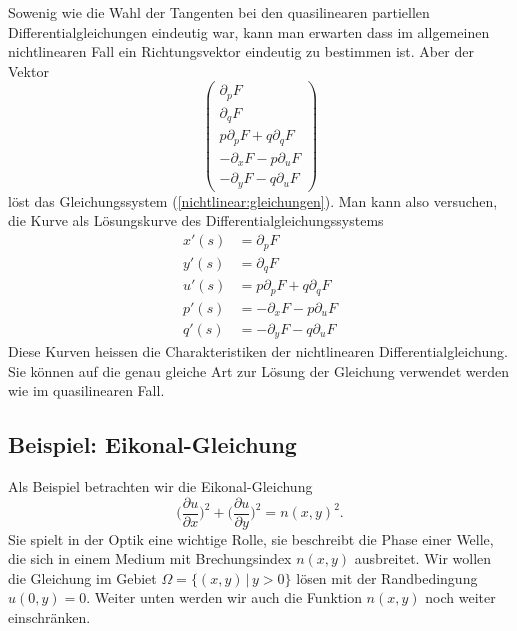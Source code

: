 Sowenig wie die Wahl der Tangenten bei den quasilinearen partiellen
Differentialgleichungen eindeutig war, kann man erwarten dass im
allgemeinen nichtlinearen Fall ein Richtungsvektor eindeutig zu
bestimmen ist. Aber der Vektor 
\[
\begin{pmatrix}
\partial_pF\\
\partial_qF\\
p\partial_pF+q\partial_qF\\
-\partial_xF-p\partial_uF\\
-\partial_yF-q\partial_uF
\end{pmatrix}
\]
löst das Gleichungssystem (\ref{nichtlinear:gleichungen}).
Man kann also versuchen, die Kurve als Lösungskurve des
Differentialgleichungssystems
\begin{align*}
x'(s)
&=
\partial_pF
\\
y'(s)
&=
\partial_qF
\\
u'(s)
&=
p\partial_pF+q\partial_qF
\\
p'(s)
&=
-\partial_xF-p\partial_uF
\\
q'(s)
&=
-\partial_yF-q\partial_uF
\end{align*}
Diese Kurven heissen die Charakteristiken der nichtlinearen
Differentialgleichung.
Sie können auf die genau gleiche Art zur Lösung der Gleichung
verwendet werden wie im quasilinearen Fall.

\subsection{Beispiel: Eikonal-Gleichung}
Als Beispiel betrachten wir die Eikonal-Gleichung 
\[
\biggl(\frac{\partial u}{\partial x}\biggr)^2
+
\biggl(\frac{\partial u}{\partial y}\biggr)^2
=
n(x,y)^2.
\]
Sie spielt in der Optik eine wichtige Rolle, sie beschreibt die
Phase einer Welle, die sich in einem Medium mit Brechungsindex $n(x,y)$
ausbreitet. Wir wollen die Gleichung im Gebiet $\Omega=\{(x,y)\,|\,y>0\}$
lösen mit der Randbedingung $u(0,y)=0$. Weiter unten werden wir auch 
die Funktion $n(x,y)$ noch weiter einschränken.

